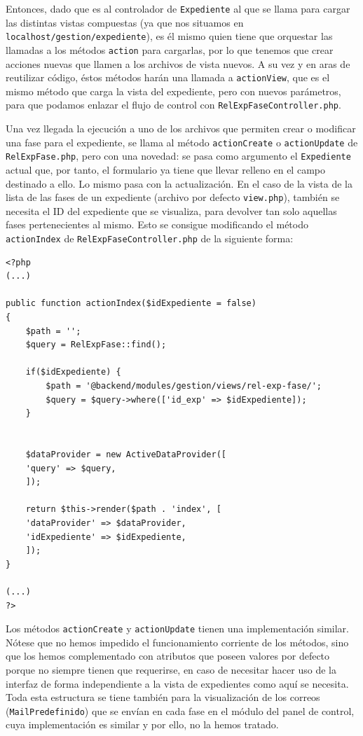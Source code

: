 Entonces, dado que es al controlador de \texttt{Expediente} al que se llama para cargar las distintas vistas compuestas (ya que nos situamos en \texttt{localhost/gestion/expediente}), es él mismo quien tiene que orquestar las llamadas a los métodos \texttt{action} para cargarlas, por lo que tenemos que crear acciones nuevas que llamen a los archivos de vista nuevos. A su vez y en aras de reutilizar código, éstos métodos harán una llamada a \texttt{actionView}, que es el mismo método que carga la vista del expediente, pero con nuevos parámetros, para que podamos enlazar el flujo de control con \texttt{RelExpFaseController.php}.

Una vez llegada la ejecución a uno de los archivos que permiten crear o modificar una fase para el expediente, se llama al método \texttt{actionCreate} o \texttt{actionUpdate} de \texttt{RelExpFase.php}, pero con una novedad: se pasa como argumento el \texttt{Expediente} actual que, por tanto, el formulario ya tiene que llevar relleno en el campo destinado a ello. Lo mismo pasa con la actualización. En el caso de la vista de la lista de las fases de un expediente (archivo por defecto \texttt{view.php}), también se necesita el ID del expediente que se visualiza, para devolver tan solo aquellas fases pertenecientes al mismo. Esto se consigue modificando el método \texttt{actionIndex} de \texttt{RelExpFaseController.php} de la siguiente forma:

\begin{verbatim}
<?php
(...)

public function actionIndex($idExpediente = false)
{
	$path = '';
	$query = RelExpFase::find();
	
	if($idExpediente) {
		$path = '@backend/modules/gestion/views/rel-exp-fase/';
		$query = $query->where(['id_exp' => $idExpediente]);
	}
	
	
	$dataProvider = new ActiveDataProvider([
	'query' => $query,
	]);
	
	return $this->render($path . 'index', [
	'dataProvider' => $dataProvider,
	'idExpediente' => $idExpediente,
	]);
}

(...)
?>
\end{verbatim}

Los métodos \texttt{actionCreate} y \texttt{actionUpdate} tienen una implementación similar. Nótese que no hemos impedido el funcionamiento corriente de los métodos, sino que los hemos complementado con atributos que poseen valores por defecto porque no siempre tienen que requerirse, en caso de necesitar hacer uso de la interfaz de forma independiente a la vista de expedientes como aquí se necesita. Toda esta estructura se tiene también para la visualización de los correos (\texttt{MailPredefinido}) que se envían en cada fase en el módulo del panel de control, cuya implementación es similar y por ello, no la hemos tratado.


